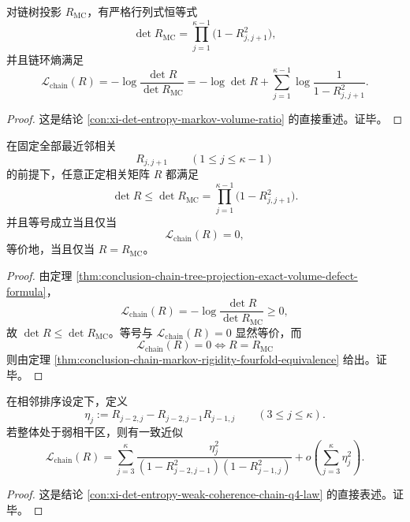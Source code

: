 \begin{theorem}[链树投影的精确体积亏损公式]\label{thm:conclusion-chain-tree-projection-exact-volume-defect-formula}
对链树投影 \(R_{\mathrm{MC}}\)，有严格行列式恒等式
\[
\det R_{\mathrm{MC}}=\prod_{j=1}^{\kappa-1}\bigl(1-R_{j,j+1}^2\bigr),
\]
并且链环熵满足
\[
\mathcal L_{\mathrm{chain}}(R)
=
-\log\frac{\det R}{\det R_{\mathrm{MC}}}
=
-\log\det R+\sum_{j=1}^{\kappa-1}\log\frac{1}{1-R_{j,j+1}^2}.
\]
\end{theorem}
\begin{proof}
这是结论 \ref{con:xi-det-entropy-markov-volume-ratio} 的直接重述。证毕。
\end{proof}

\begin{corollary}[固定最近邻数据下的最大体积完成]\label{cor:conclusion-fixed-nearest-neighbor-maximal-volume-completion}
在固定全部最近邻相关
\[
R_{j,j+1}\qquad (1\le j\le \kappa-1)
\]
的前提下，任意正定相关矩阵 \(R\) 都满足
\[
\det R\le \det R_{\mathrm{MC}}
=
\prod_{j=1}^{\kappa-1}\bigl(1-R_{j,j+1}^2\bigr).
\]
并且等号成立当且仅当
\[
\mathcal L_{\mathrm{chain}}(R)=0,
\]
等价地，当且仅当 \(R=R_{\mathrm{MC}}\)。
\end{corollary}
\begin{proof}
由定理 \ref{thm:conclusion-chain-tree-projection-exact-volume-defect-formula}，
\[
\mathcal L_{\mathrm{chain}}(R)=-\log\frac{\det R}{\det R_{\mathrm{MC}}}\ge 0,
\]
故 \(\det R\le \det R_{\mathrm{MC}}\)。等号与 \(\mathcal L_{\mathrm{chain}}(R)=0\) 显然等价，而
\[
\mathcal L_{\mathrm{chain}}(R)=0\iff R=R_{\mathrm{MC}}
\]
则由定理 \ref{thm:conclusion-chain-markov-rigidity-fourfold-equivalence} 给出。证毕。
\end{proof}

\begin{theorem}[链环熵的二阶差分偏离闭式]\label{thm:conclusion-chain-loop-entropy-second-difference-defect-expansion}
在相邻排序设定下，定义
\[
\eta_j:=R_{j-2,j}-R_{j-2,j-1}R_{j-1,j}
\qquad (3\le j\le \kappa).
\]
若整体处于弱相干区，则有一致近似
\[
\mathcal L_{\mathrm{chain}}(R)
=
\sum_{j=3}^{\kappa}
\frac{\eta_j^2}
{(1-R_{j-2,j-1}^2)(1-R_{j-1,j}^2)}
+
o\!\left(\sum_{j=3}^{\kappa}\eta_j^2\right).
\]
\end{theorem}
\begin{proof}
这是结论 \ref{con:xi-det-entropy-weak-coherence-chain-q4-law} 的直接表述。证毕。
\end{proof}

